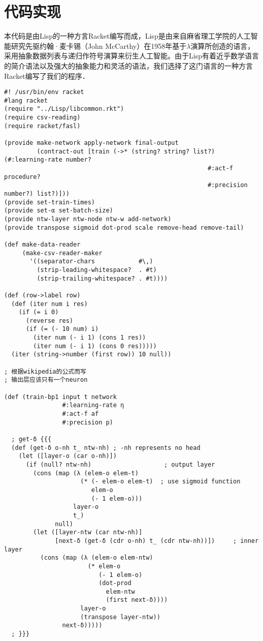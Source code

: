 \documentclass{article}
\begin{document}
  \section{代码实现}
  本代码是由Lisp的一种方言Racket编写而成，Lisp是由来自麻省理工学院的人工智能研究先驱约翰·麦卡锡（John McCarthy）在1958年基于$\lambda$演算所创造的语言，采用抽象数据列表与递归作符号演算来衍生人工智能。由于Lisp有着近乎数学语言的简介语法以及强大的抽象能力和灵活的语法，我们选择了这门语言的一种方言Racket编写了我们的程序．
  \lstset{language=Racket}
  \begin{lstlisting}
#! /usr/bin/env racket
#lang racket
(require "../Lisp/libcommon.rkt")
(require csv-reading)
(require racket/fasl)

(provide make-network apply-network final-output
         (contract-out [train (->* (string? string? list?) (#:learning-rate number?
                                                        #:act-f procedure?
                                                        #:precision number?) list?)]))
(provide set-train-times)
(provide set-α set-batch-size)
(provide ntw-layer ntw-node ntw-w add-network)
(provide transpose sigmoid dot-prod scale remove-head remove-tail)

(def make-data-reader
     (make-csv-reader-maker
       '((separator-chars            #\,)
         (strip-leading-whitespace?  . #t)
         (strip-trailing-whitespace? . #t))))

(def (row->label row)
  (def (iter num i res)
    (if (= i 0)
      (reverse res)
      (if (= (- 10 num) i)
        (iter num (- i 1) (cons 1 res))
        (iter num (- i 1) (cons 0 res)))))
  (iter (string->number (first row)) 10 null))

; 根据wikipedia的公式而写
; 输出层应该只有一个neuron

(def (train-bp1 input t network
                #:learning-rate η
                #:act-f af
                #:precision p)

  ; get-δ {{{
  (def (get-δ o-nh t_ ntw-nh) ; -nh represents no head
    (let ([layer-o (car o-nh)])
      (if (null? ntw-nh)                    ; output layer
        (cons (map (λ (elem-o elem-t)
                     (* (- elem-o elem-t)  ; use sigmoid function
                        elem-o
                        (- 1 elem-o)))
                   layer-o
                   t_)
              null)
        (let ([layer-ntw (car ntw-nh)]
              [next-δ (get-δ (cdr o-nh) t_ (cdr ntw-nh))])     ; inner layer
          (cons (map (λ (elem-o elem-ntw)
                       (* elem-o
                          (- 1 elem-o)
                          (dot-prod
                            elem-ntw
                            (first next-δ))))
                     layer-o
                     (transpose layer-ntw))
                next-δ)))))
  ; }}}


\end{lstlisting}
\end{document}
